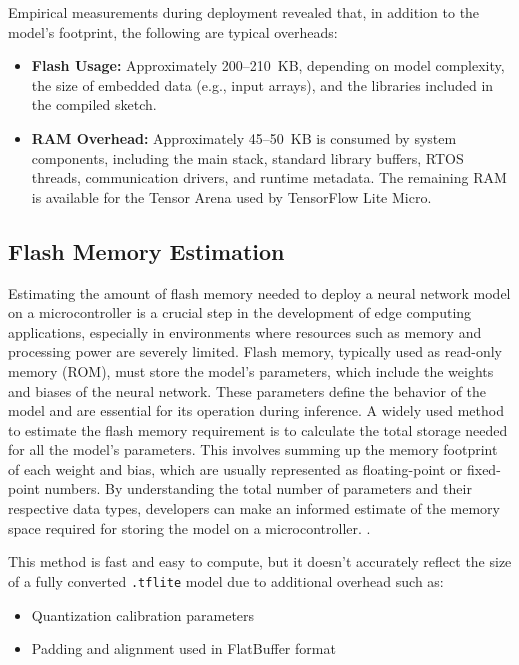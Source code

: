 Empirical measurements during deployment revealed that, in addition to the model's footprint, the following are typical overheads:

\begin{itemize}

    \item \textbf{Flash Usage:} Approximately 200--210~KB, depending on model complexity, the size of embedded data (e.g., input arrays), and the libraries included in the compiled sketch.
    
    \item \textbf{RAM Overhead:} Approximately 45--50~KB is consumed by system components, including the main stack, standard library buffers, RTOS threads, communication drivers, and runtime metadata. The remaining RAM is available for the Tensor Arena used by TensorFlow Lite Micro.

\end{itemize}








\subsection{Flash Memory Estimation}
\label{subsec:flash_memory_estimation}
Estimating the amount of flash memory needed to deploy a neural network model on a microcontroller is a crucial step in the development of edge computing applications, especially in environments where resources such as memory and processing power are severely limited. Flash memory, typically used as read-only memory (ROM), must store the model's parameters, which include the weights and biases of the neural network. These parameters define the behavior of the model and are essential for its operation during inference. A widely used method to estimate the flash memory requirement is to calculate the total storage needed for all the model's parameters. This involves summing up the memory footprint of each weight and bias, which are usually represented as floating-point or fixed-point numbers. By understanding the total number of parameters and their respective data types, developers can make an informed estimate of the memory space required for storing the model on a microcontroller. \cite{pau2023tiny}.

This method is fast and easy to compute, but it doesn't accurately reflect the size of a fully converted \texttt{.tflite} model due to additional overhead such as:
\begin{itemize}
    \item Quantization calibration parameters
    \item Padding and alignment used in FlatBuffer format \cite{manor2022custom}
\end{itemize}



